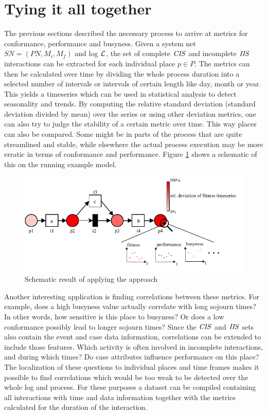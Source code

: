 \section{Tying it all together} \label{alltogether}
The previous sections described the necessary process to arrive at metrics for conformance, performance and busyness. Given a system net $SN = (PN, M_i,M_f)$ and log $\mathcal{L}$, the set of complete $\mathit{CIS}$ and incomplete $\mathit{IIS}$ interactions can be extracted for each individual place $p\in P$.
The metrics can then be calculated over time by dividing the whole process duration into a selected number of intervals or intervals of certain length like day, month or year. This yields a timeseries which can be used in statistical analysis to detect seasonality and trends.
By computing the relative standard deviation (standard deviation divided by mean) over the series or using other deviation metrics, one can also try to judge the stability of a certain metric over time. This way places can also be compared. Some might be in parts of the process that are quite streamlined and stable, while elsewhere the actual process execution may be more erratic in terms of conformance and performance. Figure \ref{fig:timeseriesschematic} shows a schematic of this on the running example model.
\begin{figure}
    \centering
    \includegraphics[width = \textwidth]{figures/concept/tyingtogether.pdf}
    \caption{Schematic result of applying the approach}
    \label{fig:timeseriesschematic}
\end{figure}
Another interesting application is finding correlations between these metrics. For example, does a high busyness value actually correlate with long sojourn times? In other words, how sensitive is this place to busyness? Or does a low conformance possibly lead to longer sojourn times? Since the $\mathit{CIS}$ and $\mathit{IIS}$ sets also contain the event and case data information, correlations can be extended to include those features. Which activity is often involved in incomplete interactions, and during which times? Do case attributes influence performance on this place? The localization of these questions to individual places and time frames makes it possible to find correlations which would be too weak to be detected over the whole log and process. For these purposes a dataset can be compiled containing all interactions with time and data information together with the metrics calculated for the duration of the interaction.

